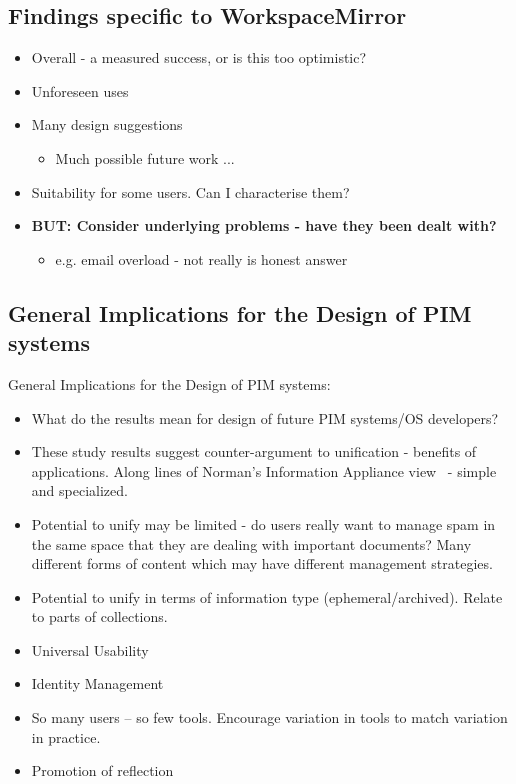 \subsection{Findings specific to WorkspaceMirror}
\begin{itemize}
	\item Overall - a measured success, or is this too optimistic?
	\item Unforeseen uses
	\item Many design suggestions
	\begin{itemize}
		\item Much possible future work ...
	\end{itemize}
	
	\item Suitability for some users. Can I characterise them?
	\item \textbf{BUT: Consider underlying problems - have they been dealt with?}
	\begin{itemize}
		\item e.g. email overload - not really is honest answer
	\end{itemize}
\end{itemize}

\subsection{General Implications for the Design of PIM systems}

General Implications for the Design of PIM systems:
\begin{itemize}
	\item What do the results mean for design of future PIM systems/OS developers?
	\item These study results suggest counter-argument to unification - benefits of applications. Along lines of Norman's Information Appliance view~\cite{norman:98} - simple and specialized.
	\item Potential to unify may be limited - do users really want to manage spam in the same space that they are dealing with important documents? Many different forms of content which may have different management strategies.
	\item Potential to unify in terms of information type (ephemeral/archived). Relate to parts of collections.
	\item Universal Usability~\cite{Shneiderman:00}
	\item Identity Management~\cite{liberty:03,myservices:01}
	\item So many users -- so few tools.  Encourage variation in tools to match variation in practice.
	\item Promotion of reflection
\end{itemize}


